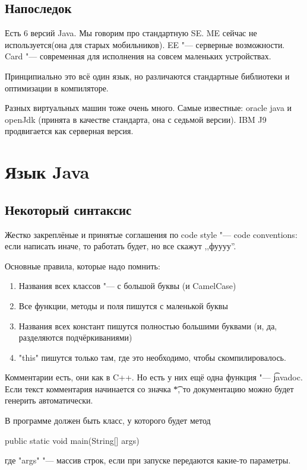 \section{Напоследок}

Есть 6 версий Java. Мы говорим про стандартную SE.
ME сейчас не используется(она для старых мобильников).
EE "--- серверные возможности.
Card "--- современная для исполнения на совсем маленьких устройствах.

Принципиально это всё один язык, но различаются стандартные библиотеки и оптимизации в компиляторе.

Разных виртуальных машин тоже очень много.
Самые известные: oracle java и openJdk
(принята в качестве стандарта, она с седьмой версии).
IBM J9 продвигается как серверная версия.

\chapter{Язык Java}

\section{Некоторый синтаксис}

Жестко закреплёные и принятые соглашения по code style "--- code conventions:
если написать иначе, то работать будет, но все скажут ,,фуууу''.

Основные правила, которые надо помнить:
\begin{enumerate}
	\item Названия всех классов "--- с большой буквы (и CamelCase)
	\item Все функции, методы и поля пишутся с маленькой буквы
	\item Названия всех констант пишутся полностью большими буквами (и, да, разделяются подчёркиваниями)
	\item \java"this" пишутся только там, где это необходимо, чтобы скомпилировалось.
\end{enumerate}

Комментарии есть, они как в C++.
Но есть у них ещё одна функция "--- \t{javadoc}.
Если текст комментария начинается со значка \t{*}, то документацию можно будет генерить автоматически.

В программе должен быть класс, у которого будет метод
\begin{javacode}
	public static void main(String[] args)
\end{javacode}
где \java"args" "--- массив строк, если при запуске передаются какие-то параметры.

